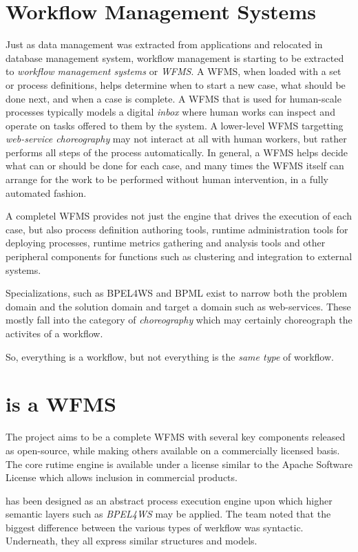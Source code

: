 \section{Workflow Management Systems}

Just as data management was extracted from applications
and relocated in database management system, workflow
management is starting to be extracted to \emph{workflow
management systems} or \emph{WFMS}.  A WFMS, when
loaded with a set or process definitions, helps determine
when to start a new case, what should be done next, and
when a case is complete.  A WFMS that is used for human-scale
processes typically models a digital \emph{inbox} where
human works can inspect and operate on tasks offered to them
by the system.  A lower-level WFMS targetting \emph{web-service
choreography} may not interact at all with human workers, but
rather performs all steps of the process automatically.
In general, a WFMS helps decide what can or should be
done for each case, and many times the WFMS itself can
arrange for the work to be performed without human
intervention, in a fully automated fashion.

A completel WFMS provides not just the engine that drives
the execution of each case, but also process definition 
authoring tools, runtime administration tools for deploying
processes, runtime metrics gathering and analysis tools and other
peripheral components for functions such as clustering and
integration to external systems.

Specializations, such as BPEL4WS and BPML exist to narrow
both the problem domain and the solution domain and target
a domain such as web-services.  These mostly fall into the
category of \emph{choreography} which may certainly
choreograph the activites of a workflow.  

So, everything is a workflow, but not everything is the
\emph{same type} of workflow.

\section{{\werkflow} is a WFMS}

The {\werkflow} project aims to be a complete WFMS with
several key components released as open-source, while making
others available on a commercially licensed basis.  The core
rutime engine is available under a license similar to the
Apache Software License which allows inclusion in commercial
products.

{\werkflow} has been designed as an abstract process execution
engine upon which higher semantic layers such as \emph{BPEL4WS}
may be applied.  The {\werkflow} team noted that the biggest
difference between the various types of werkflow was syntactic.
Underneath, they all express similar structures and models.

